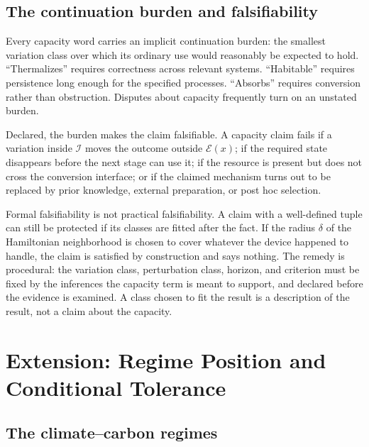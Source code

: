 \documentclass[11pt]{article}
\theoremstyle{definition}
\newcommand{\Iset}{\mathcal I}
\newcommand{\Eset}{\mathcal E}
\begin{document}
\subsection{The continuation burden and falsifiability}\label{sec:burden}

Every capacity word carries an implicit continuation burden: the smallest variation class over which its ordinary use would reasonably be expected to hold. ``Thermalizes'' requires correctness across relevant systems. ``Habitable'' requires persistence long enough for the specified processes. ``Absorbs'' requires conversion rather than obstruction. Disputes about capacity frequently turn on an unstated burden.

Declared, the burden makes the claim falsifiable. A capacity claim fails if a variation inside $\Iset$ moves the outcome outside $\Eset(x)$; if the required state disappears before the next stage can use it; if the resource is present but does not cross the conversion interface; or if the claimed mechanism turns out to be replaced by prior knowledge, external preparation, or post hoc selection.

Formal falsifiability is not practical falsifiability. A claim with a well-defined tuple can still be protected if its classes are fitted after the fact. If the radius $\delta$ of the Hamiltonian neighborhood is chosen to cover whatever the device happened to handle, the claim is satisfied by construction and says nothing. The remedy is procedural: the variation class, perturbation class, horizon, and criterion must be fixed by the inferences the capacity term is meant to support, and declared before the evidence is examined. A class chosen to fit the result is a description of the result, not a claim about the capacity.

\section{Extension: Regime Position and Conditional Tolerance}\label{sec:regime}

\subsection{The climate--carbon regimes}
\end{document}
